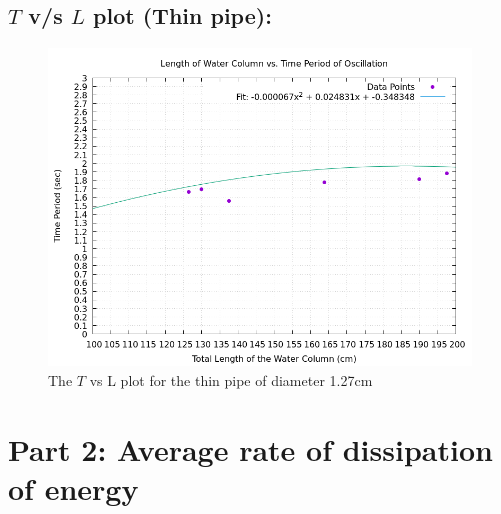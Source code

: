 \documentclass[twocolumn,11pt]{article}
\begin{document}
\subsection{$T$ v/s $L$ plot (Thin pipe):}
\begin{figure}[H]
    \centering
    \includegraphics[scale=0.3]{L_vs_T_Thin_pipe.png}
    \caption{The $T$ vs L plot for the thin pipe of diameter 1.27cm}
    \label{T2_vs_L}
\end{figure}

\section{Part 2: Average rate of dissipation of energy}
\end{document}
